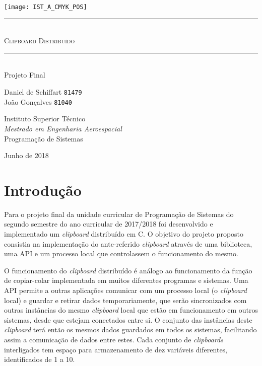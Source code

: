 \documentclass{article}
\begin{document}
\thispagestyle{empty}
	\texttt{[image: IST\_A\_CMYK\_POS]}
	
	\begin{center}
		\vspace{70mm} %
		\rule{\linewidth}{0.5pt} \\
		\vspace{2mm}
		\Huge \textsc{Clipboard Distribuído} \\
		\rule{\linewidth}{2pt} \\
		\vspace{8mm} %
		\LARGE Projeto Final
		
		\vspace{\fill} %
		\large
		Daniel de Schiffart \texttt{81479} \\
		João Gonçalves \texttt{81040}
		
		\vspace{10mm} %
		\Large Instituto Superior Técnico \\
		\textit{Mestrado em Engenharia Aeroespacial} \\
		\vspace{1mm}
		\large Programação de Sistemas
		
		\vspace{10mm} %
		\Large Junho de 2018
	\end{center}
\newpage

\tableofcontents

\newpage

\section{Introdução}

Para o projeto final da unidade curricular de Programação de Sistemas do
segundo semestre do ano curricular de 2017/2018 foi desenvolvido e
implementado um \textit{clipboard} distribuído em C. O objetivo do
projeto proposto consistia na implementação do ante-referido 
\textit{clipboard} através de uma biblioteca, uma API e um processo
local que controlassem o funcionamento do mesmo.

O funcionamento do \textit{clipboard} distribuído é análogo ao
funcionamento da função de copiar-colar implementada em muitos diferentes
programas e sistemas. Uma API permite a outras aplicações comunicar com
um processo local (o \textit{clipboard} local) e guardar e retirar dados
temporariamente, que serão sincronizados com outras instâncias do mesmo
\textit{clipboard} local que estão em funcionamento em outros sistemas,
desde que estejam conectados entre si. O conjunto das instâncias deste
\textit{clipboard} terá então os mesmos dados guardados em todos os
sistemas, facilitando assim a comunicação de dados entre estes.
Cada conjunto de \textit{clipboards} interligados tem espaço para
armazenamento de dez variáveis diferentes, identificados de 1 a 10.
\end{document}
